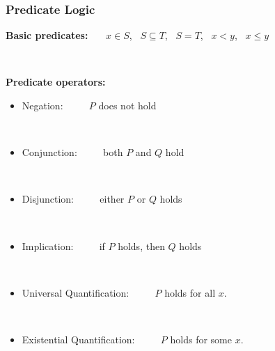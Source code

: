 \documentclass{beamer}
\begin{document}
\begin{frame}

\frametitle{Predicate Logic}

\textbf{Basic predicates:}~~~ $x\in S$,~ $S\subseteq T$,~ $S=T$,~ $x<y$,~ $x\leq y$

~

\textbf{Predicate operators:}

\begin{itemize}
\item Negation:~  ~~~  $P$ does \alert{not}  hold 

~

\item Conjunction:~  ~~~ {both} $P$ \alert{and} $Q$ hold 

~

\item Disjunction:~ ~~~ {either}  $P$ \alert{or} $Q$ holds

~

\item Implication:~ ~~~ \alert{if} $P$ holds, \alert{then} $Q$ holds

~

\item Universal Quantification:~ ~~~  $P$ holds for \alert{all}   $x$.

~

\item Existential Quantification:~ ~~~  $P$ holds for \alert{some}   $x$.

\end{itemize}


\end{frame}
\end{document}
